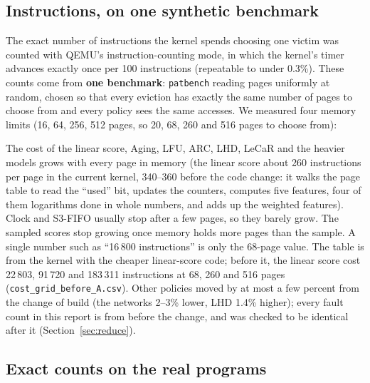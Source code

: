 \documentclass[10.5pt,a4paper]{article}
\newcommand{\code}[1]{\texttt{#1}}
\begin{document}
\subsection{Instructions, on one synthetic benchmark}

The exact number of instructions the kernel spends choosing one victim was counted with QEMU's instruction-counting mode, in which the kernel's timer advances exactly once per 100 instructions
(repeatable to under 0.3\%). These counts come from \textbf{one benchmark}: \code{patbench} reading pages uniformly at random, chosen so that every eviction has exactly the same number of pages to choose from
and every policy sees the same accesses. We measured four memory limits (16, 64, 256, 512 pages, so 20, 68, 260 and 516 pages to choose from):

\begin{table}[h]
\centering\small

\caption{Instructions to choose one victim, by number of pages to choose from (patbench uniform). Last column: extra instructions per extra page, from 68 to 516 pages.}
\label{tab:costsizes}
\end{table}

The cost of the linear score, Aging, LFU, ARC, LHD, LeCaR and the heavier models grows with every page in memory (the linear score about 260 instructions per page in the current kernel, 340--360 before the code change: it walks the page table to read the ``used'' bit,
updates the counters, computes five features, four of them logarithms done in whole numbers, and adds up the weighted features). Clock and S3-FIFO usually stop after a few pages, so they barely grow. The sampled scores
stop growing once memory holds more pages than the sample. A single number such as ``16\,800 instructions'' is only the 68-page value. The table is from the kernel with the cheaper linear-score code; before it, the linear score cost 22\,803, 91\,720 and 183\,311 instructions at 68, 260 and 516 pages (\code{cost\_grid\_before\_A.csv}). Other policies moved by at most a few percent from the change of build (the networks 2--3\% lower, LHD 1.4\% higher); every fault count in this report is from before the change, and was checked to be identical after it (Section~\ref{sec:reduce}).

\subsection{Exact counts on the real programs}
\label{sec:costreal}
\end{document}
